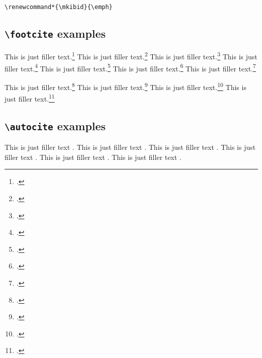 \documentclass[a4paper]{article}
\newcommand{\cmd}[1]{\texttt{\textbackslash #1}}
\begin{document}
\begin{verbatim}
\renewcommand*{\mkibid}{\emph}
\end{verbatim}

\subsection*{\cmd{footcite} examples}

This is just filler text.\footcite{aristotle:anima}
This is just filler text.\footcite{aristotle:physics}
This is just filler text.\footcite{aristotle:anima}
This is just filler text.\footcite{aristotle:physics}
This is just filler text.\footcite{aristotle:physics}
\clearpage
This is just filler text.\footcite{aristotle:physics}
This is just filler text.\footcite{aristotle:physics}

\clearpage

This is just filler text.\footcite{kant:kpv}
This is just filler text.\footcite{kant:ku}
This is just filler text.\footcite[24]{kant:kpv}
This is just filler text.\footcite[59--63]{kant:ku}

\clearpage

\subsection*{\cmd{autocite} examples}


This is just filler text \autocite{aristotle:rhetoric}.
This is just filler text \autocite{averroes/bland}.
This is just filler text \autocite{aristotle:rhetoric}.
This is just filler text \autocite{aristotle:anima}.
This is just filler text \autocite{aristotle:physics}.
This is just filler text \autocite{aristotle:physics}.

\clearpage


\printshorthands
\printbibliography
\end{document}
